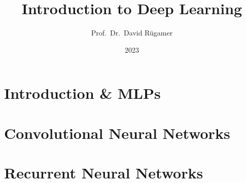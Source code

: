 \documentclass[13pt,compress]{beamer}
\title{Introduction to Deep Learning}
\author{Prof.~Dr.~David R\"ugamer}
\institute{LMU Munich, MCML}
\date{2023}
\begin{document}


\frame{\titlepage}

\section{Introduction \& MLPs}






\section{Convolutional Neural Networks}




\section{Recurrent Neural Networks}






\end{document}

